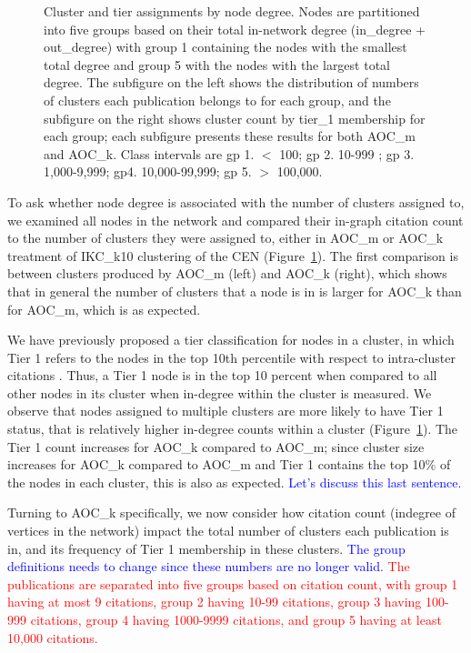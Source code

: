 \documentclass[12pt, oneside]{article}   	%
\begin{document}
\begin{figure}[H]
\begin{subfigure}[t]{0.48\textwidth}
    	\end{subfigure}
\captionsetup{width=0.9\textwidth}	
\caption{Cluster and tier assignments by node degree. Nodes are partitioned into five groups based on their total in-network degree (in\_degree + out\_degree) with group 1 containing the nodes with the smallest total degree and group 5 with the nodes with the largest total degree. The subfigure on the left shows the distribution of numbers of clusters each publication belongs to for each group, and the subfigure on the right shows cluster count by tier\_1 membership for each group; each subfigure presents these results for both AOC\_m and AOC\_k. Class intervals are gp 1. $<$ 100; gp 2. 10-999 ; gp 3. 1,000-9,999; gp4. 10,000-99,999; gp 5. $>$ 100,000.}
\label{fig:fig3}
\end{figure}


To ask whether node degree is associated with the number of clusters assigned to, we examined all nodes in the network and compared their in-graph citation count to the number of clusters they were assigned to, either in AOC\_m or AOC\_k treatment of IKC\_k10 clustering of the CEN (Figure~\ref{fig:fig3}). The first comparison is between clusters produced by AOC\_m (left) and AOC\_k (right), which shows that in general the number of clusters that a node is in is larger for AOC\_k than for AOC\_m, which is as expected.

We have previously proposed a tier classification for nodes in a cluster, in which Tier 1 refers to the nodes in the top 10th percentile with respect to intra-cluster citations \citep{Chandrasekharan2021}. Thus, a Tier 1 node is in the top 10 percent when compared to all other nodes in its cluster when in-degree within the cluster is measured. We observe that nodes assigned to multiple clusters are more likely to have Tier 1 status, that is relatively higher in-degree counts within a cluster (Figure~\ref{fig:fig3}). The Tier 1 count increases for AOC\_k compared to AOC\_m; since cluster size  increases for AOC\_k compared to AOC\_m and Tier 1 contains the top 10\% of the nodes in each cluster, this is also as expected. \textcolor{blue}{Let's discuss this last sentence.}

Turning to AOC\_k specifically, we now consider how citation count (indegree of vertices in the network) impact the total number of clusters each publication is in, and its frequency of Tier 1 membership in these clusters.
\textcolor{blue}{The group definitions needs to change since these numbers are no longer valid.}
\textcolor{red}{
The publications are separated  into five groups based on citation count, 
with group 1 having at most 9 citations, group 2 having 10-99 citations, group 3 having 100-999 citations, group 4 having 1000-9999 citations, and group 5 having
at least 10,000 citations.}
\end{document}
